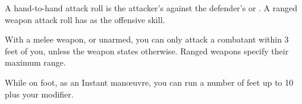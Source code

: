 
A hand-to-hand attack roll is the attacker's  against the defender's  or . A ranged weapon attack roll has  as the offensive skill.

With a melee weapon, or unarmed, you can only attack a combatant within 3 feet of you, unless the weapon states otherwise. Ranged weapons specify their maximum range.

While on foot, as an Instant man\oe{}uvre, you can run a number of feet up to 10 plus your  modifier.
